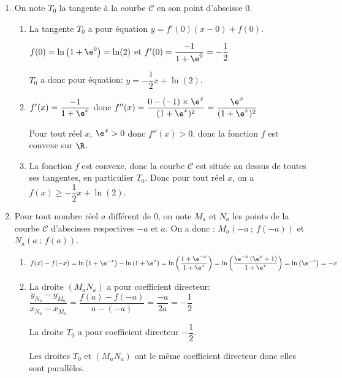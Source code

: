 \begin{enumerate}
\begin{enumerate}
	\end{enumerate}	
\item On note $T_0$ la tangente à la courbe $\mathcal{C}$ en son point d'abscisse $0$.
	\begin{enumerate}
		\item La tangente $T_0$ a pour équation $y=f'(0)\left (x-0\right )+f(0)$.		

$f(0) = \ln\left (1+\e^{0}\right )=\ln(2)$ et $f'(0) = \dfrac{-1}{1+\e^{0}} = -\dfrac{1}{2}$

$T_0$ a donc pour équation: $y=-\dfrac{1}{2}x + \ln(2)$.
		
		\item 
$f'(x)=\dfrac{-1}{1+\e^{x}}$ donc $f''(x)= \dfrac{0 - (-1)\times \e^{x}}{(1+\e^{x})^2}
= \dfrac{\e^{x}}{(1+\e^{x})^2}$

Pour tout réel $x$, $\e^{x}>0$ donc $f''(x)>0$. donc la fonction $f$ est convexe sur $\R$.		
				
		\item 
La fonction $f$ est convexe, donc  la courbe $\mathcal{C}$ est située au dessus de toutes ses tangentes, en particulier $T_0$.
Donc pour tout réel $x$, on a $f(x) \geqslant -\dfrac{1}{2} x + \ln(2)$.
		\end{enumerate}	
		
\item Pour tout nombre réel $a$ différent de 0, on note $M_a$ et $N_a$ les points de la courbe $\mathcal{C}$ d'abscisses respectives $-a$ et $a$. 
On a donc : $M_a\left(-a~;~ f(-a)\right)$ et $N_a\left(a~;~ f(a)\right)$.

	\begin{enumerate}
		\item 
$f(x)-f(-x)=\ln \left (1+\e^{-x}\right ) - \ln \left (1+\e^{x}\right )
= \ln \left ( \dfrac{1+\e^{-x}}{1+\e^{x}}\right )
= \ln \left ( \dfrac{\e^{-x}\left (\e^{x}+1\right )}{1+\e^{x}}\right )
= \ln \left (\e^{-x}\right )= -x$		
		
		\item
La droite $\left(M_aN_a\right)$ a pour coefficient directeur:
$\dfrac{y_{N_a}-y_{M_a}}{x_{N_a}-x_{M_a}}
= \dfrac{f(a)-f(-a)}{a-(-a)}
= \dfrac{-a}{2a}=-\dfrac{1}{2}$

La droite $T_0$ a pour coefficient directeur $-\dfrac{1}{2}$.

Les droites $T_0$ et $\left(M_aN_a\right)$ ont le même coefficient directeur donc elles sont parallèles.
		

	\end{enumerate}
\end{enumerate}

